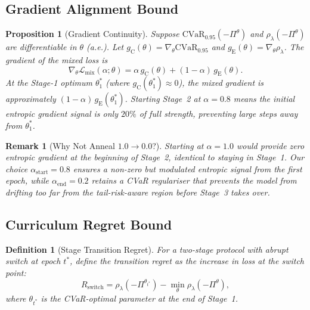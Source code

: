 \documentclass[11pt]{article}
\newtheorem{proposition}[theorem]{Proposition}
\newtheorem{definition}[theorem]{Definition}
\newtheorem{remark}[theorem]{Remark}
\newcommand{\cvar}{\mathrm{CVaR}}
\begin{document}
\subsection{Gradient Alignment Bound}

\begin{proposition}[Gradient Continuity]
\label{prop:grad_align}
Suppose $\cvar_{0.95}(-\Pi^\theta)$ and $\rho_\lambda(-\Pi^\theta)$ are differentiable in $\theta$ (a.e.).  Let $g_{\mathrm{C}}(\theta) = \nabla_\theta \cvar_{0.95}$ and $g_{\mathrm{E}}(\theta) = \nabla_\theta \rho_\lambda$.  The gradient of the mixed loss is
\begin{equation}
    \nabla_\theta \mathcal{L}_{\mathrm{mix}}(\alpha;\theta) = \alpha\, g_{\mathrm{C}}(\theta) + (1-\alpha)\, g_{\mathrm{E}}(\theta).
    \label{eq:mixed_grad}
\end{equation}
At the Stage-1 optimum $\theta_1^*$ (where $g_{\mathrm{C}}(\theta_1^*)\approx 0$), the mixed gradient is approximately $(1-\alpha)\,g_{\mathrm{E}}(\theta_1^*)$.  Starting Stage~2 at $\alpha=0.8$ means the initial entropic gradient signal is only $20\%$ of full strength, preventing large steps away from $\theta_1^*$.
\end{proposition}

\begin{remark}[Why Not Anneal $1.0\to 0.0$?]
Starting at $\alpha=1.0$ would provide zero entropic gradient at the beginning of Stage~2, identical to staying in Stage~1.  Our choice $\alpha_{\mathrm{start}}=0.8$ ensures a non-zero but modulated entropic signal from the first epoch, while $\alpha_{\mathrm{end}}=0.2$ retains a CVaR regulariser that prevents the model from drifting too far from the tail-risk-aware region before Stage~3 takes over.
\end{remark}

\subsection{Curriculum Regret Bound}

\begin{definition}[Stage Transition Regret]
For a two-stage protocol with abrupt switch at epoch $t^*$, define the \emph{transition regret} as the increase in loss at the switch point:
\begin{equation}
    R_{\mathrm{switch}} = \rho_\lambda(-\Pi^{\theta_{t^*}}) - \min_\theta \rho_\lambda(-\Pi^\theta),
\end{equation}
where $\theta_{t^*}$ is the CVaR-optimal parameter at the end of Stage~1.
\end{definition}
\end{document}
